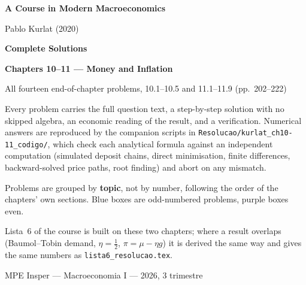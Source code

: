 \documentclass[12pt, letterpaper]{article}
\begin{document}
\begin{titlepage}
\centering
\vspace*{2.5cm}
{\Huge\bfseries\color{darkblue} A Course in Modern Macroeconomics\par}
\vspace{6pt}
{\large Pablo Kurlat (2020)\par}
\vspace{1.4cm}
{\LARGE\bfseries Complete Solutions\par}
\vspace{6pt}
{\LARGE\bfseries Chapters 10--11 --- Money and Inflation\par}
\vspace{1.2cm}
{\large All fourteen end-of-chapter problems, 10.1--10.5 and 11.1--11.9 (pp.~202--222)\par}
\vspace{2cm}

\begin{tcolorbox}[theorybox,title={What is in this file},width=0.86\textwidth]
\small
Every problem carries the full question text, a step-by-step solution with no skipped
algebra, an economic reading of the result, and a verification. Numerical answers are
reproduced by the companion scripts in \texttt{Resolucao/kurlat\_ch10-11\_codigo/}, which
check each analytical formula against an independent computation (simulated deposit
chains, direct minimisation, finite differences, backward-solved price paths, root finding)
and abort on any mismatch.

\smallskip
Problems are grouped by \textbf{topic}, not by number, following the order of the
chapters' own sections. Blue boxes are odd-numbered problems, purple boxes even.

\smallskip
Lista~6 of the course is built on these two chapters; where a result overlaps
(Baumol--Tobin demand, $\eta=\tfrac12$, $\pi=\mu-\eta g$) it is derived the same way and
gives the same numbers as \texttt{lista6\_resolucao.tex}.
\end{tcolorbox}

\vfill
{\small MPE Insper --- Macroeconomia I --- 2026, 3\textordmasculine{} trimestre\par}
\end{titlepage}

\tableofcontents
\newpage

\end{document}
